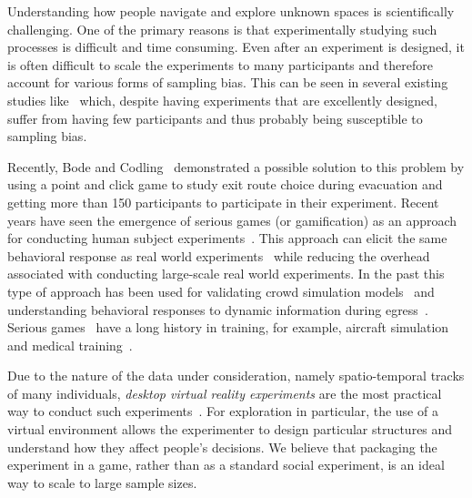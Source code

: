 Understanding how people navigate and explore unknown spaces is scientifically challenging. One of the primary reasons is that experimentally studying such processes  is difficult and time consuming. Even after an experiment is designed, it is often difficult to scale the experiments to many participants and therefore account for various forms of sampling bias. This can be seen in several existing studies like~\cite{Kuipers01012003,stankiewicz2006lost,stankiewicz2007acquistion} which, despite having experiments that are excellently designed, suffer from having few participants and thus probably being susceptible to sampling bias.

Recently, Bode and Codling~\cite{Bode2013347} demonstrated a possible solution to this problem by using a point and click game to study exit route choice during evacuation and getting more than 150 participants to participate in their experiment. Recent years have seen the emergence of serious games (or gamification) as an approach for conducting human subject experiments~\cite{Anonymous:2011ba,Aydt:2011wz,Michael:2005:SGG:1051239,Waller:2002we}. This approach can elicit the same behavioral response as real world experiments~\cite{Montello:2004uj} while reducing the overhead associated with conducting large-scale real world experiments. In the past this type of approach has been used for validating crowd simulation models~\cite{npelechano:2008ug, Anonymous:2011ba, Viswanathan2014} and understanding behavioral responses to dynamic information during egress~\cite{Bode06022014,Viswanathan:ut}. Serious games~\cite{Michael:2005:SGG:1051239} have a long history in training, for example, aircraft simulation~\cite{hays1992flight} and medical training~\cite{jama.282.9.861}.


Due to the nature of the data under consideration, namely spatio-temporal tracks of many individuals, \emph{desktop virtual reality experiments} are the most practical way to conduct such experiments~\cite{stankiewicz2006lost,stankiewicz2007acquistion}. For exploration in particular, the use of a virtual environment allows the experimenter to design particular structures and understand how they affect people's decisions. We believe that packaging the experiment in a game, rather than as a standard social experiment, is an ideal way to scale to large sample sizes.

